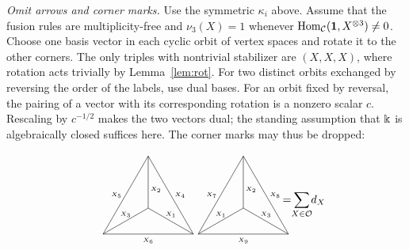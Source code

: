 \documentclass{amsart}
\begin{document}
\begin{remark}
\emph{Omit arrows and corner marks.} Use the symmetric $\kappa_i$ above.
Assume that the fusion rules are
multiplicity-free and $\nu_3(X)=1$ whenever $\mathrm{Hom}_{\mathcal{C}}({\bf 1},X^{\otimes3})\ne0$.
Choose one basis vector in each cyclic orbit of vertex spaces and rotate it
to the other corners. The only triples with nontrivial stabilizer are
$(X,X,X)$, where rotation acts trivially by Lemma~\ref{lem:rot}. For two
distinct orbits exchanged by reversing the order of the labels, use dual
bases. For an orbit fixed by reversal, the pairing of a vector with its
corresponding rotation is a nonzero scalar $c$. Rescaling by $c^{-1/2}$
makes the two vectors dual; the standing assumption that $\Bbbk$ is
algebraically closed suffices here. The corner marks may thus be dropped:
$$
\raisebox{-1.4cm}{
\begin{tikzpicture}[scale=1.43]
\draw (2,0) -- (1,0) node [below] {\tiny ${X_6}$};
\draw (0,0) node [below] { } -- (1,0);
\draw (2,0) node [below] { } -- (1.5,.866) node [right] {\tiny ${X_4}$};
\draw (1.5,.866) -- (1,1.732);
\draw (1,1.732)	node [above] { } -- (.5,.866) node [left] {\tiny ${X_5}$};
\draw (.5,.866) -- (0,0);
\draw (1,0.577) -- (.5,.2885) node [above] {\tiny ${X_3}$};
\draw (0,0) -- (.5,.2885);
\draw (1,0.577) node [below=.015cm] { } -- (1,1.1545);\node[anchor=west,inner sep=2pt] at (1,.99) {\tiny ${X_2}$};
\draw (1,1.732) -- (1,1.1545);
\draw (1,0.577) -- (1.5,.2885) node [above] {\tiny ${X_1}$};
\draw (2,0) -- (1.5,.2885);
\end{tikzpicture}} \hspace{-.2cm}
\raisebox{-1.4cm}{
\begin{tikzpicture}[scale=1.43]
\draw (2,0) -- (1,0) node [below] {\tiny ${X_9}$};
\draw (0,0) node [below] { } -- (1,0);
\draw (2,0) node [below] { } -- (1.5,.866) node [right] {\tiny ${X_8}$};
\draw (1,1.732) -- (1.5,.866);
\draw (1,1.732)	node [above] { } -- (.5,.866) node [left] {\tiny ${X_7}$};
\draw (0,0) -- (.5,.866);
\draw (1,0.577) -- (.5,.2885) node [above] {\tiny ${X_1}$};
\draw (0,0) -- (.5,.2885);
\draw (1,0.577) node [below=.015cm] { } -- (1,1.1545);\node[anchor=west,inner sep=2pt] at (1,.99) {\tiny ${X_2}$};
\draw (1,1.732) -- (1,1.1545);
\draw (1,0.577) -- (1.5,.2885) node [above] {\tiny ${X_3}$};
\draw (2,0) -- (1.5,.2885);
\end{tikzpicture}}
\hspace{-.4cm} = \hspace{-.1cm} \sum_{X \in \mathcal{O}} \hspace{-.1cm} d_X \hspace{-.3cm}
$$
\end{remark}
\end{document}
